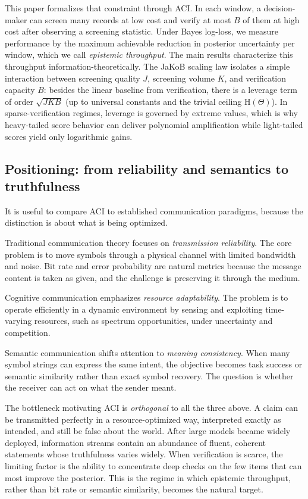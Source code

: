 \documentclass[twocolumn]{scholar7}
\newcommand{\Hh}{\mathrm{H}}
\begin{document}
This paper formalizes that constraint through ACI. In each window, a decision-maker can screen many records at low cost and verify at most \(B\) of them at high cost after observing a screening statistic. Under Bayes log-loss, we measure performance by the maximum achievable reduction in posterior uncertainty per window, which we call \emph{epistemic throughput}. The main results characterize this throughput information-theoretically. The JaKoB scaling law isolates a simple interaction between screening quality \(J\), screening volume \(K\), and verification capacity \(B\): besides the linear baseline from verification, there is a leverage term of order \(\sqrt{JKB}\) (up to universal constants and the trivial ceiling \(\Hh(\Theta)\)). In sparse-verification regimes, leverage is governed by extreme values, which is why heavy-tailed score behavior can deliver polynomial amplification while light-tailed scores yield only logarithmic gains.

\subsection{Positioning: from reliability and semantics to truthfulness}
It is useful to compare ACI to established communication paradigms, because the distinction is about what is being optimized.

Traditional communication theory focuses on \emph{transmission reliability}. The core problem is to move symbols through a physical channel with limited bandwidth and noise. Bit rate and error probability are natural metrics because the message content is taken as given, and the challenge is preserving it through the medium.

Cognitive communication emphasizes \emph{resource adaptability}. The problem is to operate efficiently in a dynamic environment by sensing and exploiting time-varying resources, such as spectrum opportunities, under uncertainty and competition.

Semantic communication shifts attention to \emph{meaning consistency}. When many symbol strings can express the same intent, the objective becomes task success or semantic similarity rather than exact symbol recovery. The question is whether the receiver can act on what the sender meant.

The bottleneck motivating ACI is \emph{orthogonal} to all the three above. A claim can be transmitted perfectly in a resource-optimized way, interpreted exactly as intended, and still be false about the world. After large models became widely deployed, information streams contain an abundance of fluent, coherent statements whose truthfulness varies widely. When verification is scarce, the limiting factor is the ability to concentrate deep checks on the few items that can most improve the posterior. This is the regime in which epistemic throughput, rather than bit rate or semantic similarity, becomes the natural target.
\end{document}
